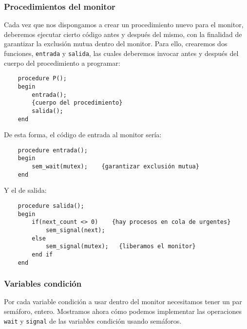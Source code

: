 \subsubsection{Procedimientos del monitor}
Cada vez que nos dispongamos a crear un procedimiento nuevo para el monitor, deberemos ejecutar cierto código antes y después del mismo, con la finalidad de garantizar la exclusión mutua dentro del monitor. Para ello, crearemos dos funciones, \verb|entrada| y \verb|salida|, las cuales deberemos invocar antes y después del cuerpo del procedimiento a programar:
\begin{verbatim}
    procedure P();
    begin
        entrada();
        {cuerpo del procedimiento}
        salida();
    end
\end{verbatim}
De esta forma, el código de entrada al monitor sería:
\setlength{\columnsep}{1cm}
\begin{verbatim}
    procedure entrada();
    begin
        sem_wait(mutex);    {garantizar exclusión mutua}
    end
\end{verbatim}    
Y el de salida:
\begin{verbatim}
    procedure salida();
    begin
        if(next_count <> 0)    {hay procesos en cola de urgentes}
            sem_signal(next);
        else
            sem_signal(mutex);   {liberamos el monitor}
        end if
    end
\end{verbatim}

\subsubsection{Variables condición}
Por cada variable condición a usar dentro del monitor necesitamos tener un par semáforo, entero. Mostramos ahora cómo podemos implementar las operaciones \verb|wait| y \verb|signal| de las variables condición usando semáforos.

